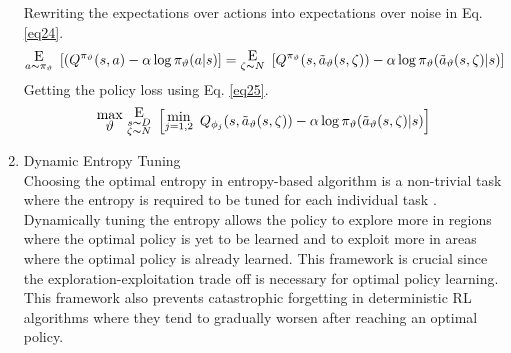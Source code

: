 \begin{enumerate}[label={\alph*)}]
\begin{equation}
    \end{equation}
    Rewriting the expectations over actions into expectations over noise in Eq. \ref{eq24}.
    \begin{equation}
        \substack{ \mathlarger{\mathlarger{\text{E}}}  \\ a \thicksim \pi_{\vartheta}}\hspace{5pt} [(Q^{\pi_{\vartheta}}(s, a) - \alpha \log \pi_{\vartheta}(a|s)] = \substack{ \mathlarger{\mathlarger{\text{E}}}  \\ \zeta \thicksim N}\hspace{5pt}[Q^{\pi_{\vartheta}}(s, \Tilde{a}_{\vartheta}(s, \zeta)) - \alpha \log \pi_{\vartheta} (\Tilde{a}_{\vartheta}(s, \zeta)|s)]
        \label{eq24}
    \end{equation}
    Getting the policy loss using Eq. \ref{eq25}.
    \begin{equation}
        \substack{\mathlarger{\text{max}} \\ \mathlarger{\vartheta}}\hspace{3pt} \substack{ \mathlarger{\mathlarger{\text{E}}}  \\ s \thicksim D \\ \zeta \thicksim N}\hspace{5pt} \Big[\substack{\mathlarger{\text{min}} \\ j=1,2}\hspace{5pt} Q_{\phi_{j}}(s, \Tilde{a}_{\vartheta}(s, \zeta)) - \alpha \log \pi_{\vartheta}(\Tilde{a}_{\vartheta}(s, \zeta)|s) \Big] 
        \label{eq25}
    \end{equation}\clearpage
    \item{Dynamic Entropy Tuning}\\
    Choosing the optimal entropy in entropy-based algorithm is a non-trivial task where the entropy is required to be tuned for each individual task \cite{haarnoja2019soft}. Dynamically tuning the entropy allows the policy to explore more in regions where the optimal policy is yet to be learned and to exploit more in areas where the optimal policy is already learned. This framework is crucial since the exploration-exploitation trade off is necessary for optimal policy learning. This framework also prevents catastrophic forgetting in deterministic RL algorithms where they tend to gradually worsen after reaching an optimal policy.\\
    

\end{enumerate}
